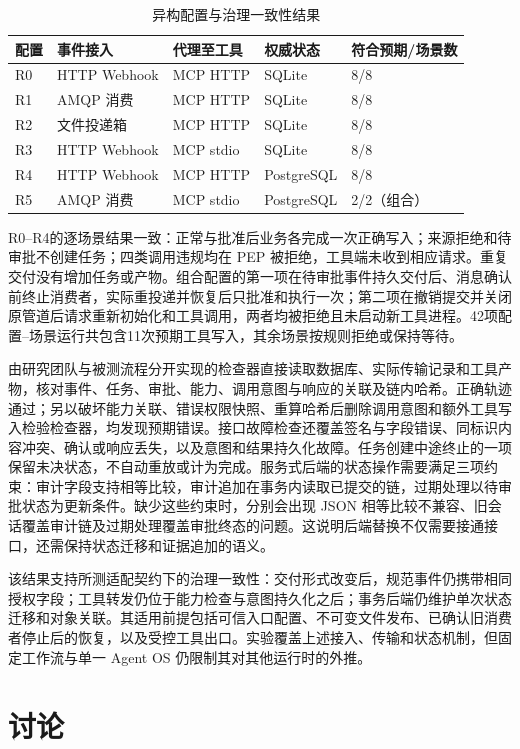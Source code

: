 \begin{table}[htbp]
\centering
\caption{异构配置与治理一致性结果}
\label{tab:heterogeneity-rr022}
\small
\begin{tabular}{lllll}
\toprule
配置 & 事件接入 & 代理至工具 & 权威状态 & 符合预期/场景数 \\
\midrule
R0 & HTTP Webhook & MCP HTTP & SQLite & 8/8 \\
R1 & AMQP 消费 & MCP HTTP & SQLite & 8/8 \\
R2 & 文件投递箱 & MCP HTTP & SQLite & 8/8 \\
R3 & HTTP Webhook & MCP stdio & SQLite & 8/8 \\
R4 & HTTP Webhook & MCP HTTP & PostgreSQL & 8/8 \\
R5 & AMQP 消费 & MCP stdio & PostgreSQL & 2/2（组合） \\
\bottomrule
\end{tabular}
\end{table}

R0--R4的逐场景结果一致：正常与批准后业务各完成一次正确写入；来源拒绝和待审批不创建任务；四类调用违规均在 PEP 被拒绝，工具端未收到相应请求。重复交付没有增加任务或产物。组合配置的第一项在待审批事件持久交付后、消息确认前终止消费者，实际重投递并恢复后只批准和执行一次；第二项在撤销提交并关闭原管道后请求重新初始化和工具调用，两者均被拒绝且未启动新工具进程。42项配置--场景运行共包含11次预期工具写入，其余场景按规则拒绝或保持等待。

由研究团队与被测流程分开实现的检查器直接读取数据库、实际传输记录和工具产物，核对事件、任务、审批、能力、调用意图与响应的关联及链内哈希。正确轨迹通过；另以破坏能力关联、错误权限快照、重算哈希后删除调用意图和额外工具写入检验检查器，均发现预期错误。接口故障检查还覆盖签名与字段错误、同标识内容冲突、确认或响应丢失，以及意图和结果持久化故障。任务创建中途终止的一项保留未决状态，不自动重放或计为完成。服务式后端的状态操作需要满足三项约束：审计字段支持相等比较，审计追加在事务内读取已提交的链，过期处理以待审批状态为更新条件。缺少这些约束时，分别会出现 JSON 相等比较不兼容、旧会话覆盖审计链及过期处理覆盖审批终态的问题。这说明后端替换不仅需要接通接口，还需保持状态迁移和证据追加的语义。

该结果支持所测适配契约下的治理一致性：交付形式改变后，规范事件仍携带相同授权字段；工具转发仍位于能力检查与意图持久化之后；事务后端仍维护单次状态迁移和对象关联。其适用前提包括可信入口配置、不可变文件发布、已确认旧消费者停止后的恢复，以及受控工具出口。实验覆盖上述接入、传输和状态机制，但固定工作流与单一 Agent OS 仍限制其对其他运行时的外推。

\section{讨论}\label{sec:discussion-v11}

